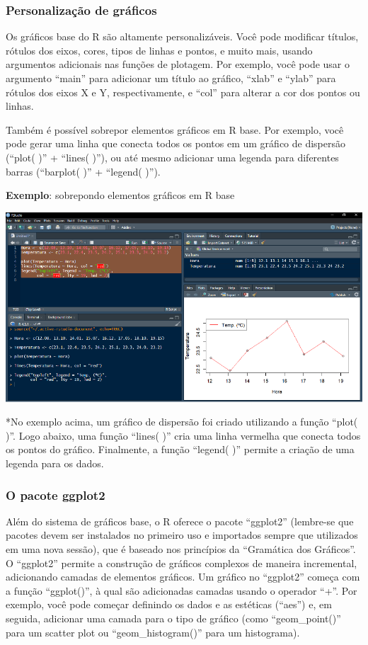 \documentclass[
]{book}
\begin{document}
\subsubsection{Personalização de gráficos}\label{personalizauxe7uxe3o-de-gruxe1ficos}

Os gráficos base do R são altamente personalizáveis. Você pode modificar títulos, rótulos dos eixos, cores, tipos de linhas e pontos, e muito mais, usando argumentos adicionais nas funções de plotagem. Por exemplo, você pode usar o argumento ``main'' para adicionar um título ao gráfico, ``xlab'' e ``ylab'' para rótulos dos eixos X e Y, respectivamente, e ``col'' para alterar a cor dos pontos ou linhas.

Também é possível sobrepor elementos gráficos em R base. Por exemplo, você pode gerar uma linha que conecta todos os pontos em um gráfico de dispersão (``plot( )'' + ``lines( )''), ou até mesmo adicionar uma legenda para diferentes barras (``barplot( )'' + ``legend( )'').

\textbf{Exemplo}: sobrepondo elementos gráficos em R base

\includegraphics{images/clipboard-2859898208.png}

*No exemplo acima, um gráfico de dispersão foi criado utilizando a função ``plot( )''. Logo abaixo, uma função ``lines( )'' cria uma linha vermelha que conecta todos os pontos do gráfico. Finalmente, a função ``legend( )'' permite a criação de uma legenda para os dados.

\subsubsection{O pacote ggplot2}\label{o-pacote-ggplot2}

Além do sistema de gráficos base, o R oferece o pacote ``ggplot2'' (lembre-se que pacotes devem ser instalados no primeiro uso e importados sempre que utilizados em uma nova sessão), que é baseado nos princípios da ``Gramática dos Gráficos''. O ``ggplot2'' permite a construção de gráficos complexos de maneira incremental, adicionando camadas de elementos gráficos. Um gráfico no ``ggplot2'' começa com a função ``ggplot()'', à qual são adicionadas camadas usando o operador ``+''. Por exemplo, você pode começar definindo os dados e as estéticas (``aes'') e, em seguida, adicionar uma camada para o tipo de gráfico (como ``geom\_point()'' para um scatter plot ou ``geom\_histogram()'' para um histograma).
\end{document}
